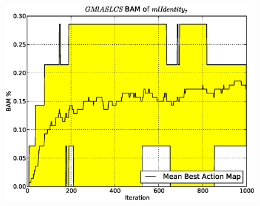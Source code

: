 \begin{figure}[ht]
  \centering
  \includegraphics[scale=.49]{./images/artificial/gmlaslcs0/base/mlIdentity7GMlASLCSbam.eps}
\end{figure}


